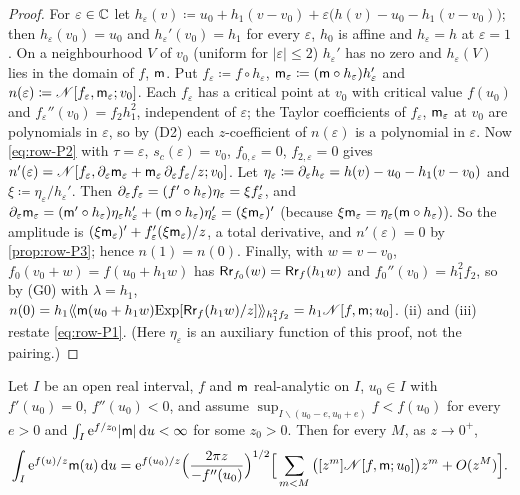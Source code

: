\begin{proof}
For $\varepsilon\in\mathbb{C}$ let $h_\varepsilon(v)\coloneqq u_0+h_1(v-v_0)+\varepsilon\big(h(v)-u_0-h_1(v-v_0)\big)$; then $h_\varepsilon(v_0)=u_0$ and $h_\varepsilon'(v_0)=h_1$ for every $\varepsilon$, $h_0$ is affine and $h_\varepsilon=h$ at $\varepsilon=1$. On a neighbourhood $V$ of $v_0$ (uniform for $|\varepsilon|\leq2$) $h_\varepsilon'$ has no zero and $h_\varepsilon(V)$ lies in the domain of $f$, $\mathsf{m}$. Put $f_\varepsilon\coloneqq f\circ h_\varepsilon$, $\mathsf{m}_\varepsilon\coloneqq(\mathsf{m}\circ h_\varepsilon)h_\varepsilon'$ and $n(\varepsilon)\coloneqq\mathscr{N}[f_\varepsilon,\mathsf{m}_\varepsilon;v_0]$. Each $f_\varepsilon$ has a critical point at $v_0$ with critical value $f(u_0)$ and $f_\varepsilon''(v_0)=f_2h_1^2$, independent of $\varepsilon$; the Taylor coefficients of $f_\varepsilon$, $\mathsf{m}_\varepsilon$ at $v_0$ are polynomials in $\varepsilon$, so by (D2) each $z$-coefficient of $n(\varepsilon)$ is a polynomial in $\varepsilon$. Now \eqref{eq:row-P2} with $\tau=\varepsilon$, $s_c(\varepsilon)=v_0$, $f_{0,\varepsilon}=0$, $f_{2,\varepsilon}=0$ gives $n'(\varepsilon)=\mathscr{N}[f_\varepsilon,\partial_\varepsilon\mathsf{m}_\varepsilon+\mathsf{m}_\varepsilon\,\partial_\varepsilon f_\varepsilon/z;v_0]$. Let $\eta_\varepsilon\coloneqq\partial_\varepsilon h_\varepsilon=h(v)-u_0-h_1(v-v_0)$ and $\xi\coloneqq\eta_\varepsilon/h_\varepsilon'$. Then $\partial_\varepsilon f_\varepsilon=(f'\circ h_\varepsilon)\eta_\varepsilon=\xi f_\varepsilon'$, and $\partial_\varepsilon\mathsf{m}_\varepsilon=(\mathsf{m}'\circ h_\varepsilon)\eta_\varepsilon h_\varepsilon'+(\mathsf{m}\circ h_\varepsilon)\eta_\varepsilon'=(\xi\mathsf{m}_\varepsilon)'$ (because $\xi\mathsf{m}_\varepsilon=\eta_\varepsilon(\mathsf{m}\circ h_\varepsilon)$). So the amplitude is $(\xi\mathsf{m}_\varepsilon)'+f_\varepsilon'(\xi\mathsf{m}_\varepsilon)/z$, a total derivative, and $n'(\varepsilon)=0$ by \cref{prop:row-P3}; hence $n(1)=n(0)$. Finally, with $w=v-v_0$, $f_0(v_0+w)=f(u_0+h_1w)$ has $\mathsf{Rr}_{f_0}(w)=\mathsf{Rr}_f(h_1w)$ and $f_0''(v_0)=h_1^2f_2$, so by (G0) with $\lambda=h_1$, $n(0)=h_1\langle\!\langle \mathsf{m}(u_0+h_1w)\mathrm{Exp}[\mathsf{Rr}_f(h_1w)/z]\rangle\!\rangle_{h_1^2f_2}=h_1\mathscr{N}[f,\mathsf{m};u_0]$. (ii) and (iii) restate \eqref{eq:row-P1}. (Here $\eta_\varepsilon$ is an auxiliary function of this proof, not the pairing.)
\end{proof}

\begin{lem}
\label{lem:row-laplace}
Let $I$ be an open real interval, $f$ and $\mathsf{m}$ real-analytic on $I$, $u_0\in I$ with $f'(u_0)=0$, $f''(u_0)<0$, and assume $\sup_{I\smallsetminus(u_0-e,u_0+e)}f<f(u_0)$ for every $e>0$ and $\int_I\mathrm{e}^{f/z_0}|\mathsf{m}|\,\mathrm{d} u<\infty$ for some $z_0>0$. Then for every $M$, as $z\to0^+$,
\begin{equation}
\label{eq:row-laplace}
\int_I\mathrm{e}^{f(u)/z}\mathsf{m}(u)\,\mathrm{d} u=\mathrm{e}^{f(u_0)/z}\Big(\frac{2\pi z}{-f''(u_0)}\Big)^{1/2}\Big[\sum_{m<M}\big([z^m]\mathscr{N}[f,\mathsf{m};u_0]\big)z^m+O(z^M)\Big].
\end{equation}
\end{lem}

